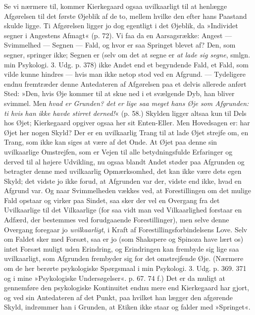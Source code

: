 \documentclass[12pt,a4paper,openany]{book}
\newcommand{\opage}[1]{\marginnote{\footnotesize\textit{[#1]}}}
\begin{document}
Se vi nærmere til, kommer Kierkegaard ogsaa uvilkaarligt
til at henlægge Afgørelsen til det første Øjeblik
af de to, mellem hvilke den efter hans Paastand skulde
ligge. Ti Afgørelsen ligger jo dog egentligt i det Øjeblik,
da »Individet segner i Angestens Afmagt« (p. 72).
Vi faa da en Aarsagsrække: Angest --- Svimmelhed ---
Segnen --- Fald, og hvor er saa Springet blevet af? Den,
som segner, springer ikke; Segnen er (selv om det at
segne er \textit{at lade sig segne}, smlgn. min Psykologi. 3. Udg.
p. 378) ikke Andet end et begyndende Fald, et Fald,
som vilde kunne hindres --- hvis man ikke netop stod
ved en Afgrund. --- Tydeligere endnu fremtræder denne
Antedateren af Afgørelsen paa et delvis allerede anført
Sted: »Den, hvis Øje kommer til at skue ned i et svælgende
Dyb, han bliver svimmel. Men \textit{hvad er Grunden?
det er lige saa meget hans Øje som Afgrunden: ti hvis
han ikke havde stirret derned!}« (p. 58.) Skylden ligger
\opage{81}altsaa kun til Dels hos Øjet; Kierkegaard opgiver ogsaa
her sit Enten-Eller. Men Hovedsagen er: har Øjet her
nogen Skyld? Der er en uvilkaarlig Trang til at lade
Øjet strejfe om, en Trang, som ikke kan siges at være
af det Onde. At Øjet paa denne sin uvilkaarlige Omstrejfen,
som er Vejen til alle betydningsfulde Erfaringer
og derved til al højere Udvikling, nu ogsaa blandt Andet
støder paa Afgrunden og betragter denne med uvilkaarlig
Opmærksomhed, det kan ikke være dets egen Skyld; det
vidste jo ikke forud, at Afgrunden var der, vidste end
ikke, hvad en Afgrund var. Og naar Svimmelheden
vækkes ved, at Forestillingen om det mulige Fald opstaar
og virker paa Sindet, saa sker der vel en Overgang fra
det Uvilkaarlige til det Vilkaarlige (for saa vidt man
ved Vilkaarlighed forstaar en Adfærd, der bestemmes ved
forudgaaende Forestillinger), men selve denne Overgang
foregaar jo \textit{uvilkaarligt}, i Kraft af Forestillingsforbindelsens
Love. Selv om Faldet sker med Forsæt, saa er jo
(som Shakspere og Spinoza have lært os) intet Forsæt
muligt uden Erindring, og Erindringen kan frembyde sig
lige saa uvilkaarligt, som Afgrunden frembyder sig for
det omstrejfende Øje. (Nærmere om de her berørte
psykologiske Spørgsmaal i min Psykologi. 3. Udg. p. 369.
371 og i mine »Psykologiske Undersøgelser«. p. 67. 74 f.)
Det er da muligt at gennemføre den psykologiske Kontinuitet
endnu mere end Kierkegaard har gjort, og ved sin
Antedateren af det Punkt, paa hvilket han lægger den
afgørende Skyld, indrømmer han i Grunden, at Etiken
ikke staar og falder med »Springet«.
\end{document}
